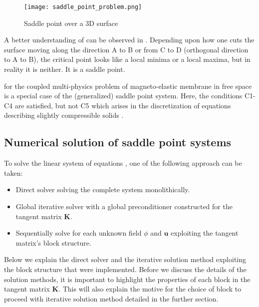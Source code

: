 \begin{figure}[h]
\centering
\texttt{[image: saddle\_point\_problem.png]}
\caption{Saddle point over a 3D surface \cite{Buduma_book}}
\label{fig:3.1}
\end{figure}

A better understanding of  can be observed in . Depending upon how one cuts the surface moving along the direction A to B or from C to D (orthogonal direction to A to B), the critical point looks like a local minima or a local maxima, but in reality it is neither. It is a saddle point. \par 

 for the coupled multi-physics problem of magneto-elastic membrane in free space is a special case of the (generalized) saddle point system. Here, the conditions C1-C4 are satisfied, but not C5 which arises in the discretization of equations describing slightly compressible solids \cite{Benzi2005}.

\subsection{Numerical solution of saddle point systems}

To solve the linear system of equations , one of the following approach can be taken:
\begin{itemize}
\item Direct solver solving the complete system monolithically.
\item Global iterative solver with a global preconditioner constructed for the tangent matrix $\mathbf{K}$.
\item Sequentially solve for each unknown field $\phi$ and $\mathbf{u}$ exploiting the tangent matrix's block structure.
\end{itemize}
Below we explain the direct solver and the iterative solution method exploiting the block structure that were implemented. Before we discuss the details of the solution methods, it is important to highlight the properties of each block in the tangent matrix $\mathbf{K}$. This will also explain the motive for the choice of block to proceed with iterative solution method detailed in the further section.\par 

